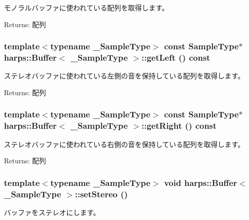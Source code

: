モノラルバッファに使われている配列を取得します。 \begin{Desc}
\item[Returns:]配列 \end{Desc}
\subsubsection[getLeft]{\setlength{\rightskip}{0pt plus 5cm}template$<$typename \_\-SampleType$>$ const SampleType$\ast$ {\bf harps::Buffer}$<$ \_\-SampleType $>$::getLeft () const\hspace{0.3cm}{\tt  [inline]}}\label{classharps_1_1Buffer_1172c500abe58b618a8a765cef5b9189}


ステレオバッファに使われている左側の音を保持している配列を取得します。 \begin{Desc}
\item[Returns:]配列 \end{Desc}
\subsubsection[getRight]{\setlength{\rightskip}{0pt plus 5cm}template$<$typename \_\-SampleType$>$ const SampleType$\ast$ {\bf harps::Buffer}$<$ \_\-SampleType $>$::getRight () const\hspace{0.3cm}{\tt  [inline]}}\label{classharps_1_1Buffer_17f18647a15e3ec85c4e6e497e2639f2}


ステレオバッファに使われている右側の音を保持している配列を取得します。 \begin{Desc}
\item[Returns:]配列 \end{Desc}
\subsubsection[setStereo]{\setlength{\rightskip}{0pt plus 5cm}template$<$typename \_\-SampleType$>$ void {\bf harps::Buffer}$<$ \_\-SampleType $>$::setStereo ()\hspace{0.3cm}{\tt  [inline]}}\label{classharps_1_1Buffer_5b03fbc0c2d1a6cede5a3c8a6d08aff9}


バッファをステレオにします。 
